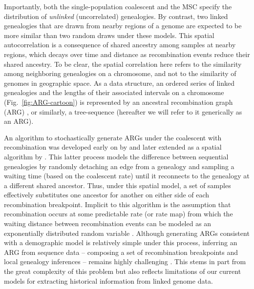 \documentclass[11pt]{article}
\begin{document}
Importantly, both the single-population coalescent and the MSC specify 
the distribution of \emph{unlinked} (uncorrelated) genealogies.
By contrast, two linked genealogies that are drawn from nearby regions of a genome %
are expected to be more similar than two random draws under these models. This spatial 
autocorrelation is a consequence of shared ancestry among samples at nearby regions, 
which decays over time and distance as recombination events reduce their shared ancestry.
To be clear, the spatial correlation here refers to the similarity 
among neighboring genealogies on a chromosome, and not to the similarity of genomes 
in geographic space.
As a data structure, an ordered series of linked genealogies and the lengths of 
their associated intervals on a chromosome (Fig.~\ref{fig:ARG-cartoon}) is represented 
by an ancestral recombination graph (ARG)
\citep{griffiths_ancestral_1996}, or similarly, a tree-sequence 
\citep{kelleher2016efficient}
(hereafter we will refer to it generically as an ARG).

An algorithm to stochastically generate ARGs under the coalescent with 
recombination was developed early on by \citet{hudson1983properties} and 
later extended as a spatial algorithm by \citet{wiuf_recombination_1999}.
This latter process models the difference between sequential 
genealogies by randomly detaching an edge from a genealogy and sampling
a waiting time (based on the 
coalescent rate) until it reconnects to the genealogy at a different shared ancestor.
Thus, under this spatial model, a set of samples effectively substitutes
one ancestor for another on either side of each recombination breakpoint.
Implicit to this algorithm is the assumption that recombination 
occurs at some predictable rate (or rate map) from which the 
waiting distance between recombination events can be modeled as an 
exponentially distributed random variable \citep{wiuf_recombination_1999}.
Although generating ARGs consistent with a demographic model is 
relatively simple under this process, inferring an ARG from sequence data 
-- composing a set of recombination breakpoints and local genealogy inferences -- 
remains highly challenging \citep{y_c_brandt_evaluation_2022}.
This stems in part from the great complexity of this problem 
but also reflects limitations of our current models for 
extracting historical information from linked genome data.
\end{document}
